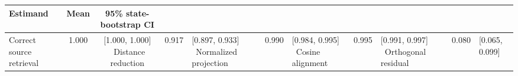 \begin{tabular}{lcc}
\toprule
Estimand & Mean & 95\% state-bootstrap CI \\
\midrule
Correct source retrieval & 1.000 & [1.000, 1.000] \
Distance reduction & 0.917 & [0.897, 0.933] \
Normalized projection & 0.990 & [0.984, 0.995] \
Cosine alignment & 0.995 & [0.991, 0.997] \
Orthogonal residual & 0.080 & [0.065, 0.099] \
\bottomrule
\end{tabular}
